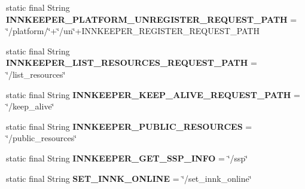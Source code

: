 \begin{DoxyCompactItemize}
static final String {\bfseries I\+N\+N\+K\+E\+E\+P\+E\+R\+\_\+\+P\+L\+A\+T\+F\+O\+R\+M\+\_\+\+U\+N\+R\+E\+G\+I\+S\+T\+E\+R\+\_\+\+R\+E\+Q\+U\+E\+S\+T\+\_\+\+P\+A\+TH} = \char`\"{}/platform/\char`\"{}+\char`\"{}/un\char`\"{}+I\+N\+N\+K\+E\+E\+P\+E\+R\+\_\+\+R\+E\+G\+I\+S\+T\+E\+R\+\_\+\+R\+E\+Q\+U\+E\+S\+T\+\_\+\+P\+A\+TH
\item 
\mbox{\label{classeu_1_1h2020_1_1symbiote_1_1ssp_1_1constants_1_1InnkeeperRestControllerConstants_a9a61dffa5907b0d8dd1c3147a853b1f3}} 
static final String {\bfseries I\+N\+N\+K\+E\+E\+P\+E\+R\+\_\+\+L\+I\+S\+T\+\_\+\+R\+E\+S\+O\+U\+R\+C\+E\+S\+\_\+\+R\+E\+Q\+U\+E\+S\+T\+\_\+\+P\+A\+TH} = \char`\"{}/list\+\_\+resources\char`\"{}
\item 
\mbox{\label{classeu_1_1h2020_1_1symbiote_1_1ssp_1_1constants_1_1InnkeeperRestControllerConstants_a6c7b5e8033afecd77edd5014b355838d}} 
static final String {\bfseries I\+N\+N\+K\+E\+E\+P\+E\+R\+\_\+\+K\+E\+E\+P\+\_\+\+A\+L\+I\+V\+E\+\_\+\+R\+E\+Q\+U\+E\+S\+T\+\_\+\+P\+A\+TH} = \char`\"{}/keep\+\_\+alive\char`\"{}
\item 
\mbox{\label{classeu_1_1h2020_1_1symbiote_1_1ssp_1_1constants_1_1InnkeeperRestControllerConstants_ad917d2cba1a4d4b9220bc0e75c0721ea}} 
static final String {\bfseries I\+N\+N\+K\+E\+E\+P\+E\+R\+\_\+\+P\+U\+B\+L\+I\+C\+\_\+\+R\+E\+S\+O\+U\+R\+C\+ES} = \char`\"{}/public\+\_\+resources\char`\"{}
\item 
\mbox{\label{classeu_1_1h2020_1_1symbiote_1_1ssp_1_1constants_1_1InnkeeperRestControllerConstants_ac97560d8636d16561f3a718df8a12971}} 
static final String {\bfseries I\+N\+N\+K\+E\+E\+P\+E\+R\+\_\+\+G\+E\+T\+\_\+\+S\+S\+P\+\_\+\+I\+N\+FO} = \char`\"{}/ssp\char`\"{}
\item 
\mbox{\label{classeu_1_1h2020_1_1symbiote_1_1ssp_1_1constants_1_1InnkeeperRestControllerConstants_a41ae73153680e115ec27a0a737ff7e7e}} 
static final String {\bfseries S\+E\+T\+\_\+\+I\+N\+N\+K\+\_\+\+O\+N\+L\+I\+NE} = \char`\"{}/set\+\_\+innk\+\_\+online\char`\"{}

\end{DoxyCompactItemize}
